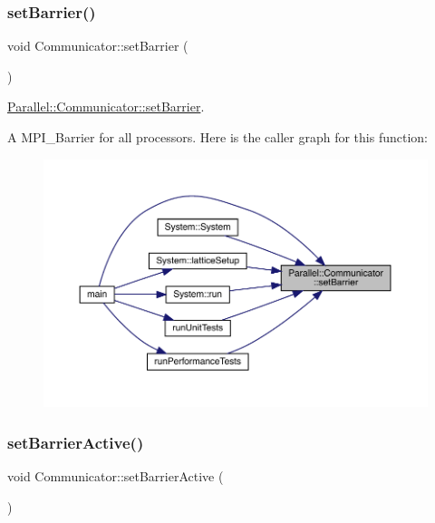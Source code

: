\subsubsection{\texorpdfstring{setBarrier()}{setBarrier()}}
{\footnotesize\ttfamily void Communicator\+::set\+Barrier (\begin{DoxyParamCaption}{ }\end{DoxyParamCaption})\hspace{0.3cm}{\ttfamily [static]}}



\mbox{\hyperlink{class_parallel_1_1_communicator_a14aa3d54f5efe28094df886948e3dee2}{Parallel\+::\+Communicator\+::set\+Barrier}}. 

A M\+P\+I\+\_\+\+Barrier for all processors. Here is the caller graph for this function\+:\nopagebreak
\begin{figure}[H]
\begin{center}
\leavevmode
\includegraphics[width=350pt]{class_parallel_1_1_communicator_a14aa3d54f5efe28094df886948e3dee2_icgraph}
\end{center}
\end{figure}
\mbox{\label{class_parallel_1_1_communicator_af61a4b8a49509982ae96d2a99dfb9f49}} 
\subsubsection{\texorpdfstring{setBarrierActive()}{setBarrierActive()}}
{\footnotesize\ttfamily void Communicator\+::set\+Barrier\+Active (\begin{DoxyParamCaption}{ }\end{DoxyParamCaption})\hspace{0.3cm}{\ttfamily [static]}}




